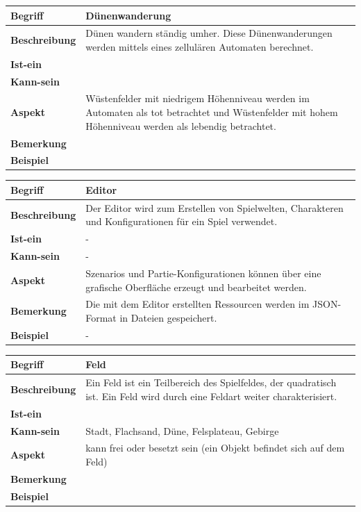 \documentclass[12pt]{article}
\begin{document}
\begin{tabularx}{\linewidth}{|l|X|}
\hline
\textbf{Begriff} & \textbf{Dünenwanderung} \\
\hline
\textbf{Beschreibung} & Dünen wandern ständig umher. Diese Dünenwanderungen werden mittels eines zellulären Automaten berechnet. \\
\hline
\textbf{Ist-ein} & \\
\hline
\textbf{Kann-sein} & \\
\hline
\textbf{Aspekt} & Wüstenfelder mit niedrigem Höhenniveau werden im Automaten als \glqq{}tot\grqq{} betrachtet und Wüstenfelder mit hohem Höhenniveau werden als \glqq{}lebendig\grqq{} betrachtet. \\
\hline
\textbf{Bemerkung} &  \\
\hline
\textbf{Beispiel} &  \\
\hline
\end{tabularx}

\begin{tabularx}{\linewidth}{|l|X|}
\hline
\textbf{Begriff} & \textbf{Editor} \\
\hline
\textbf{Beschreibung} & Der Editor wird zum Erstellen von Spielwelten, Charakteren und Konfigurationen für ein Spiel verwendet. \\
\hline
\textbf{Ist-ein} & - \\
\hline
\textbf{Kann-sein} & - \\
\hline
\textbf{Aspekt} & Szenarios und Partie-Konfigurationen können über eine grafische Oberfläche erzeugt und bearbeitet werden. \\
\hline
\textbf{Bemerkung} & Die mit dem Editor erstellten Ressourcen werden im JSON-Format in Dateien gespeichert. \\
\hline
\textbf{Beispiel} & - \\
\hline
\end{tabularx}

\begin{tabularx}{\linewidth}{|l|X|}
\hline
\textbf{Begriff} & \textbf{Feld} \\
\hline
\textbf{Beschreibung} & Ein Feld ist ein Teilbereich des Spielfeldes, der quadratisch ist. Ein Feld wird durch eine Feldart weiter charakterisiert. \\
\hline
\textbf{Ist-ein} &  \\
\hline
\textbf{Kann-sein} & Stadt, Flachsand, Düne, Felsplateau, Gebirge \\
\hline
\textbf{Aspekt} & kann frei oder besetzt sein (ein Objekt befindet sich auf dem Feld) \\
\hline
\textbf{Bemerkung} &  \\
\hline
\textbf{Beispiel} & \\
\hline
\end{tabularx}
\end{document}
